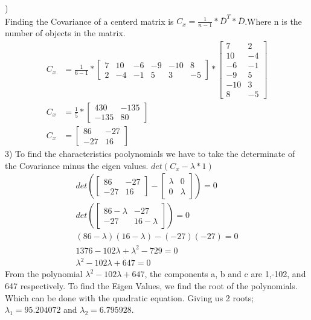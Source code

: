 \documentclass[12pt,english]{article}
\begin{document}
)\\
Finding the Covariance of a centerd matrix is $C_{x} = \frac{1}{n-1} * \bar{D}^{T}*\bar{D}$.Where n is the number of objects in the matrix. 
\begin{equation*}
\begin{split}
C_{x}&= \frac{1}{6-1}
*
\begin{bmatrix}7 & 10 & -6& -9 & -10 & 8\\2 & -4 & -1& 5 & 3 &-5\end{bmatrix}
*
\begin{bmatrix}7 &  2 \\10 & -4 \\-6 & -1 \\-9 &  5 \\-10 &  3 \\8 & -5 \end{bmatrix}\\
C_{x} &= \frac{1}{5}
*
\begin{bmatrix}430 & -135 \\-135 & 80\end{bmatrix}\\
C_{x} &= 
\begin{bmatrix}86 & -27 \\-27 & 16\end{bmatrix}
\end{split}
\end{equation*}
3) To find the characteristics poolynomials we have to take the determinate of the Covariance minus the eigen values. 
$det(C_{x} -\lambda *1)$
\begin{equation*}
\begin{split}
det(
\begin{bmatrix}86 & -27 \\-27 & 16\end{bmatrix}
- 
\begin{bmatrix}\lambda & 0 \\0 & \lambda\end{bmatrix}) = 0\\
det(
\begin{bmatrix}86 - \lambda & -27 \\-27 & 16 - \lambda
\end{bmatrix}) = 0\\
(86-\lambda)(16-\lambda) - (-27)(-27) = 0\\
1376 -102\lambda + \lambda^{2} - 729 = 0\\
\lambda^{2} -102\lambda + 647 = 0
\end{split}
\end{equation*}
From the polynomial $\lambda^{2} -102\lambda + 647 $, the components a, b and c are 1,-102, and 647 respectively. To find the Eigen Values, we find the root of the polynomials. Which can be done with the quadratic equation. Giving us 2  roots; $\lambda_{1} = 95.204072$ and $\lambda_{2} = 6.795928$.
\end{document}
